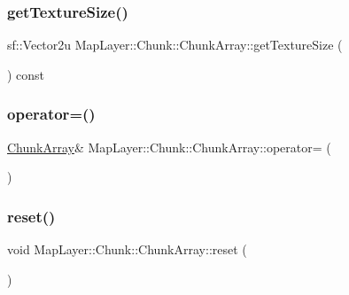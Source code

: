 \subsubsection{\texorpdfstring{get\+Texture\+Size()}{getTextureSize()}}
{\footnotesize\ttfamily sf\+::\+Vector2u Map\+Layer\+::\+Chunk\+::\+Chunk\+Array\+::get\+Texture\+Size (\begin{DoxyParamCaption}{ }\end{DoxyParamCaption}) const\hspace{0.3cm}{\ttfamily [inline]}}

\mbox{\label{classMapLayer_1_1Chunk_1_1ChunkArray_ad5c7843e61bbddfb1be30ec93d75510f}} 
\subsubsection{\texorpdfstring{operator=()}{operator=()}}
{\footnotesize\ttfamily \hyperlink{classMapLayer_1_1Chunk_1_1ChunkArray}{Chunk\+Array}\& Map\+Layer\+::\+Chunk\+::\+Chunk\+Array\+::operator= (\begin{DoxyParamCaption}\item[{const \hyperlink{classMapLayer_1_1Chunk_1_1ChunkArray}{Chunk\+Array} \&}]{ }\end{DoxyParamCaption})\hspace{0.3cm}{\ttfamily [delete]}}

\mbox{\label{classMapLayer_1_1Chunk_1_1ChunkArray_a4f93efce951889766d0336525e697cdd}} 
\subsubsection{\texorpdfstring{reset()}{reset()}}
{\footnotesize\ttfamily void Map\+Layer\+::\+Chunk\+::\+Chunk\+Array\+::reset (\begin{DoxyParamCaption}{ }\end{DoxyParamCaption})\hspace{0.3cm}{\ttfamily [inline]}}



